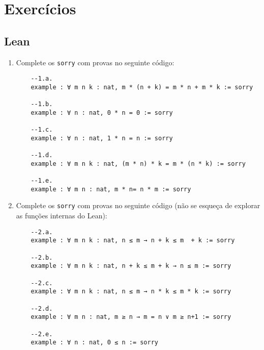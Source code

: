 \section{Exercícios}
\subsection{Lean}
\begin{enumerate}
    \item Complete os \lstinline{sorry} com provas no seguinte código:
    
    \begin{lstlisting}
    --1.a.
    example : ∀ m n k : nat, m * (n + k) = m * n + m * k := sorry
    
    --1.b.
    example : ∀ n : nat, 0 * n = 0 := sorry
    
    --1.c.
    example : ∀ n : nat, 1 * n = n := sorry
    
    --1.d.
    example : ∀ m n k : nat, (m * n) * k = m * (n * k) := sorry
    
    --1.e.
    example : ∀ m n : nat, m * n= n * m := sorry
    \end{lstlisting}
    
    \item Complete os \lstinline{sorry} com provas no seguinte código (não se esqueça de explorar as funções internas do Lean):
    
    \begin{lstlisting}
    --2.a.
    example : ∀ m n k : nat, n ≤ m → n + k ≤ m  + k := sorry
    
    --2.b.
    example : ∀ m n k : nat, n + k ≤ m + k → n ≤ m := sorry
    
    --2.c.
    example : ∀ m n k : nat, n ≤ m → n * k ≤ m * k := sorry
    
    --2.d.
    example : ∀ m n : nat, m ≥ n → m = n ∨ m ≥ n+1 := sorry
    
    --2.e.
    example : ∀ n : nat, 0 ≤ n := sorry
    \end{lstlisting}
    \end{enumerate}
